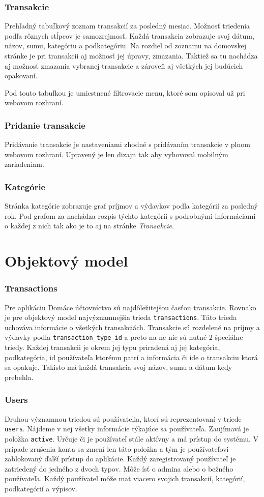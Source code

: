 \documentclass[12pt,oneside]{book}
\begin{document}
\subsubsection{Transakcie}
Prehľadný tabuľkový zoznam transakcií za posledný mesiac. Možnosť triedenia podľa rôznych stĺpcov je samozrejmosť. Každá transakcia zobrazuje svoj dátum, názov, sumu, kategóriu a podkategóriu. Na rozdiel od zoznamu na domovskej stránke je pri transakcii aj možnosť jej úpravy, zmazania. Taktiež sa tu nachádza aj možnosť zmazania vybranej transakcie a zároveň aj všetkých jej budúcich opakovaní.

Pod touto tabuľkou je umiestnené filtrovacie menu, ktoré som opisoval už pri webovom rozhraní.
\subsubsection{Pridanie transakcie}
Pridávanie transakcie je nastaveniami zhodné s pridávaním transakcie v plnom webovom rozhraní. Upravený je len dizajn tak aby vyhovoval mobilným zariadeniam.
\subsubsection{Kategórie}
Stránka kategórie zobrazuje graf príjmov a výdavkov podľa kategórií za posledný rok. Pod grafom za nachádza rozpis týchto kategórií s podrobnými informáciami o každej z nich tak ako je to aj na stránke \emph{Transakcie}. 


\section{Objektový model}
\subsubsection{Transactions}
Pre aplikáciu Domáce účtovníctvo sú najdôležitejšou časťou transakcie. Rovnako je pre objektový model najvýznamnejšia trieda \texttt{transactions}. Táto trieda uchováva informácie o všetkých transakciách. Transakcie sú rozdelené na príjmy a výdavky podľa \texttt{transaction\_type\_id} a preto na ne nie sú nutné 2 špeciálne triedy. Každej transakcii je okrem jej typu priradená aj jej kategória, podkategória, id používateľa ktorému patrí a informácia či ide o transakciu ktorá sa opakuje. Takisto má každá transakcia svoj názov, sumu a dátum kedy prebehla.
\subsubsection{Users}
Druhou významnou triedou sú používatelia, ktorí sú reprezentovaní v triede \texttt{users}. Nájdeme v nej všetky informácie týkajúce sa používateľa. Zaujímavá je položka \texttt{active}. Určuje či je používateľ stále aktívny a má prístup do systému. V prípade zrušenia konta sa zmení len táto položka a tým je používateľovi zablokovaný ďalší prístup do aplikácie. Každý zaregistrovaný používateľ je zatriedený do jedného z dvoch typov. Môže ísť o admina alebo o bežného používateľa. Každý používateľ môže mať viacero svojich transakcií, kategórií, podkategórií a výpisov.
\end{document}
